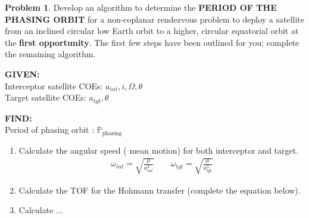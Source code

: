 \documentclass[10pt]{article}
\theoremstyle{definition}
\newtheorem{prob}{Problem}[section]
\begin{document}
\clearpage\newpage
\null\newpage
\null\newpage

\begin{prob}
    Develop an algorithm to determine the \textbf{PERIOD OF THE PHASING ORBIT} for a non-coplanar rendezvous problem to deploy a satellite from an inclined circular low Earth orbit to a higher, circular equatorial orbit at the \textbf{first opportunity}.
    The first  few steps have been outlined for you; complete the remaining algorithm.

\noindent\textbf{GIVEN:} \\
        Interceptor satellite COEs: \( a_{int}, i, \Omega, \theta\)\\
        Target satellite COEs: \( a_{tgt}, \theta\)

\noindent\textbf{FIND:} \\
Period of phasing orbit : \( \mathbb{P}_{\text{phasing}}\)

\begin{enumerate}
\item Calculate the angular speed ( mean motion) for both interceptor and target.
    \begin{align*}
        \omega_{int} = \sqrt{\frac{\mu}{a_{int}^3}} \qquad \omega_{tgt} = \sqrt{\frac{\mu}{a_{tgt}^3}}
    \end{align*}

\item Calculate the TOF for the Hohmann transfer (complete the equation below).
    \vspace*{2cm}
\item Calculate ...
\end{enumerate}
\end{prob}
\clearpage\newpage
\null\newpage
\null\newpage
\end{document}
